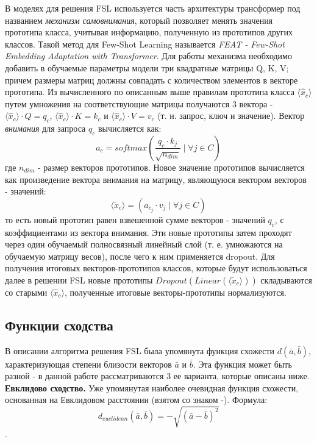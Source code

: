 \documentclass[a4paper, 12pt]{report}
\begin{document}
В моделях для решения FSL используется часть архитектуры трансформер под названием \textit{механизм самовнимания}, который позволяет менять значения прототипа класса, учитывая информацию, полученную из прототипов других классов. Такой метод для Few-Shot Learning называется \textit{FEAT - Few-Shot Embedding Adaptation with Transformer}. Для работы механизма необходимо добавить в обучаемые параметры модели три квадратные матрицы Q, K, V; причем размеры матриц должны совпадать с количеством элементов в векторе прототипа. Из вычисленного по описанным выше правилам прототипа класса $\langle \hat{x}_c \rangle$ путем умножения на соответствующие матрицы получаются 3 вектора - $\langle \hat{x}_c \rangle \cdot Q = q_{c}$, $\langle \hat{x}_c \rangle \cdot K = k_{c}$ и $\langle \hat{x}_c \rangle \cdot V = v_{c}$ (т. н. запрос, ключ и значение). Вектор \textit{внимания} для запроса $q_{c}$ вычисляется как: $$a_{c} = softmax\left(\frac{q_{c} \cdot k_{j}}{\sqrt{n_{dim}}} \; | \;  \forall j \in C \right)$$ где $n_{dim}$ - размер векторов прототипов. Новое значение прототипов вычисляется как произведение вектора внимания на матрицу, являющуюся вектором векторов - значений: $$\langle \tilde{x}_c \rangle =\left(  a_{c_j} \cdot  v_{j}  \; | \;  \forall j \in C  \right)$$ то есть новый прототип равен взвешенной сумме векторов - значений $q_{c}$, с коэффициентами из вектора внимания. Эти новые прототипы затем проходят через один обучаемый полносвязный линейный слой (т. е. умножаются на обучаемую матрицу весов), после чего к ним применяется dropout. Для получения итоговых векторов-прототипов классов, которые будут использоваться далее в решении FSL новые прототипы $Dropout \left(Linear \left( \langle \tilde{x}_c \rangle \right) \right)$ складываются со старыми $\langle \hat{x}_c \rangle$, полученные итоговые векторы-прототипы нормализуются.

\subsection{Функции сходства}

В описании алгоритма решения FSL была упомянута функция схожести $d(\bar{a}, \bar{b})$, характеризующая степени близости векторов $\bar{a}$ и $\bar{b}$. Эта функция может быть разной - в данной работе рассматриваются 3 ее варианта, которые описаны ниже. \\

\textbf {Евклидово сходство.} Уже упомянутая наиболее очевидная функция схожести, основанная на Евклидовом расстоянии (взятом со знаком -). Формула: $$d_{euclidean}(\bar{a}, \bar{b}) = -\sqrt{{(\bar{a} - \bar{b})}^2}$$.\\
\end{document}
